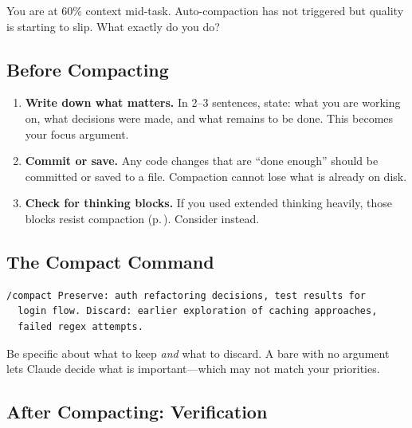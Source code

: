 
You are at 60\% context mid-task. Auto-compaction has not triggered
but quality is starting to slip. What exactly do you do?

\subsection*{Before Compacting}

\begin{enumerate}
  \item \textbf{Write down what matters.} In 2--3 sentences, state:
    what you are working on, what decisions were made, and what
    remains to be done. This becomes your  focus argument.
  \item \textbf{Commit or save.} Any code changes that are ``done enough''
    should be committed or saved to a file. Compaction cannot lose
    what is already on disk.
  \item \textbf{Check for thinking blocks.} If you used extended thinking
    heavily, those blocks resist compaction
    (p.\,\pageref{warn:thinking-compaction}).
    Consider  instead.
\end{enumerate}

\subsection*{The Compact Command}

\begin{verbatim}
/compact Preserve: auth refactoring decisions, test results for
  login flow. Discard: earlier exploration of caching approaches,
  failed regex attempts.
\end{verbatim}

\noindent Be specific about what to keep \emph{and} what to discard.
A bare  with no argument lets Claude decide what is
important---which may not match your priorities.

\subsection*{After Compacting: Verification}

